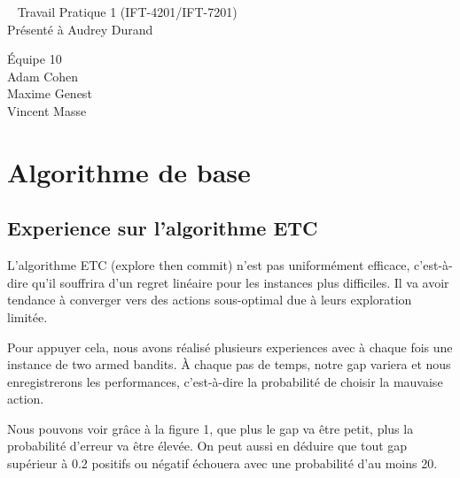 \documentclass[letterpaper,11pt]{article}
\begin{document}
\begin{center}
~
\vfill
\LARGE{Travail Pratique 1 (IFT-4201/IFT-7201)}\\[0.4cm]

\Large{Présenté à Audrey Durand}

\vfill
\large{Équipe 10 \\ Adam Cohen \\ Maxime Genest \\ Vincent Masse}

\vfill
\thispagestyle{empty}

\end{center}
\clearpage

\pagestyle{fancy}


%


\section{Algorithme de base}

\subsection{Experience sur l'algorithme ETC}
L'algorithme ETC (explore then commit) n'est pas uniformément efficace, c'est-à-dire qu'il souffrira d'un regret linéaire pour les instances plus difficiles.
Il va avoir tendance à converger vers des actions sous-optimal due à leurs exploration limitée.

Pour appuyer cela, nous avons réalisé plusieurs experiences avec à chaque fois une instance de two armed bandits.
À chaque pas de temps, notre gap variera et nous enregistrerons les performances, c'est-à-dire la probabilité de choisir la mauvaise action.

Nous pouvons voir grâce à la figure 1, que plus le gap va être petit, plus la probabilité d'erreur va être élevée. On peut aussi en déduire que tout gap supérieur à 0.2 positifs ou négatif échouera avec une probabilité d’au moins 20.
\end{document}
